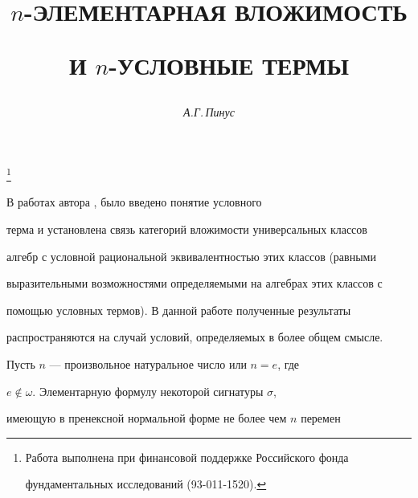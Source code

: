 \author{\it А.Г.\,Пинус} 




\title{{\selectfont$n$}-ЭЛЕМЕНТАРНАЯ ВЛОЖИМОСТЬ 


И {\selectfont\protect$n$}-УСЛОВНЫЕ ТЕРМЫ} 


 


\thanks{Работа выполнена при финансовой поддержке Российского фонда 


фундаментальных исследований (93-011-1520).} 


\date{} 




 


\pagestyle{plain} %


 


 




 


\maketitle 


\label{begin} 


 


В работах автора \cite{1}, \cite{2} было введено понятие условного 


терма и установлена связь категорий вложимости универсальных классов 


алгебр с условной рациональной эквивалентностью этих классов (равными 


выразительными возможностями определяемыми на алгебрах этих классов с 


помощью условных термов). В данной работе полученные результаты 


распространяются на случай условий, определяемых в более общем смысле. 


 


Пусть $n$ --- произвольное натуральное число или $n=e$, где 


$e\notin\omega$. Элементарную формулу некоторой сигнатуры $\sigma$, 


имеющую в пренексной нормальной форме не более чем $n$ перемен


